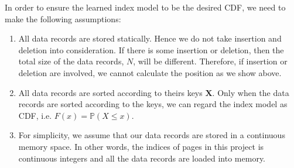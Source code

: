 In order to ensure the learned index model to be the desired CDF, we need to make the following assumptions:

\begin{enumerate}
	\item All data records are stored statically. Hence we do not take insertion and deletion into consideration. If there is some insertion or deletion, then the total size of the data records, $N$, will be different. Therefore, if insertion or deletion are involved, we cannot calculate the position as we show above.
	\item All data records are sorted according to theirs keys $\boldsymbol{X}$. Only when the data records are sorted according to the keys, we can regard the index model as CDF, i.e. $F(x)=\mathbb{P}(X\leq x)$.
	\item For simplicity, we assume that our data records are stored in a continuous memory space. In other words, the indices of pages in this project is continuous integers and all the data records are loaded into memory.
\end{enumerate}